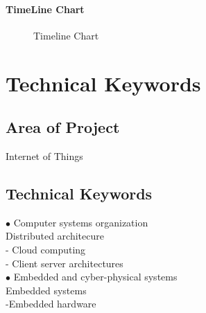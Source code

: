 \documentclass[oneside,a4paper,12pt]{report}
\begin{document}
\subsubsection{TimeLine Chart}
\begin{center}
	\begin{figure}[!htbp]
		\centering
	  \caption{Timeline Chart}
	  \label{fig:act-dig}
	\end{figure}
\end{center}  
\newpage


\chapter{Technical Keywords}
\section{Area of Project}
Internet of Things
\section{Technical Keywords}

$\bullet$ Computer systems organization\\ 
Distributed architecure\\
- Cloud computing \\
- Client server architectures\\
$\bullet$ Embedded and cyber-physical systems\\
Embedded systems\\
-Embedded hardware\\
 
\end{document}
